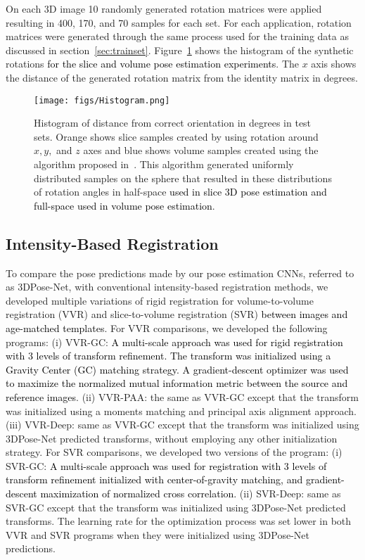 \documentclass[journal,transmag]{IEEEtran}
\begin{document}
On each 3D image 10 randomly generated rotation matrices were applied resulting in 400, 170, and 70 samples for each set. For each application, rotation matrices were generated through the same process used for the training data as discussed in section~\ref{sec:trainset}. Figure~\ref{fig:Histogram} shows the histogram of the synthetic rotations \textcolor{black}{for the slice and volume pose estimation experiments}. The $x$ axis shows the distance of the generated rotation matrix from the identity matrix in degrees.%

\begin{figure}
    \centering
    \texttt{[image: figs/Histogram.png]}
    \caption{Histogram of distance from correct orientation in degrees in test sets. Orange shows slice samples created by using rotation around $x, y,$ and $z$ axes and blue shows volume samples created using the algorithm proposed in~\cite[p.~355]{arvo2013graphics}. This algorithm generated uniformly distributed samples on the sphere that resulted in these distributions of rotation angles in half-space \textcolor{black}{used in slice 3D pose estimation and full-space used in volume pose estimation}.}
    \label{fig:Histogram}
\end{figure}

\subsection{Intensity-Based Registration}
To compare the pose predictions made by our pose estimation CNNs, referred to as 3DPose-Net, with conventional intensity-based registration methods, we developed multiple variations of rigid registration for volume-to-volume registration (VVR) and slice-to-volume registration (SVR) \textcolor{black}{between images and age-matched templates}. For VVR comparisons, we developed the following programs: (i) VVR-GC: \textcolor{black}{A multi-scale approach was used for rigid registration with 3 levels of transform refinement. The transform was initialized using a Gravity Center (GC) matching strategy. A gradient-descent optimizer was used to maximize the normalized mutual information metric between the source and reference images}. (ii) VVR-PAA: the same as VVR-GC except that the transform was initialized using a moments matching and principal axis alignment approach. (iii) VVR-Deep: same as VVR-GC except that the transform was initialized using 3DPose-Net predicted transforms, without employing any other initialization strategy. For SVR comparisons, we developed two versions of the program: (i) SVR-GC: \textcolor{black}{A multi-scale approach was used for registration with 3 levels of transform refinement initialized with center-of-gravity matching, and gradient-descent maximization of normalized cross correlation.} (ii) SVR-Deep: same as SVR-GC except that the transform was initialized using 3DPose-Net predicted transforms. The learning rate for the optimization process was set lower in both VVR and SVR programs when they were initialized using 3DPose-Net predictions.
\end{document}
